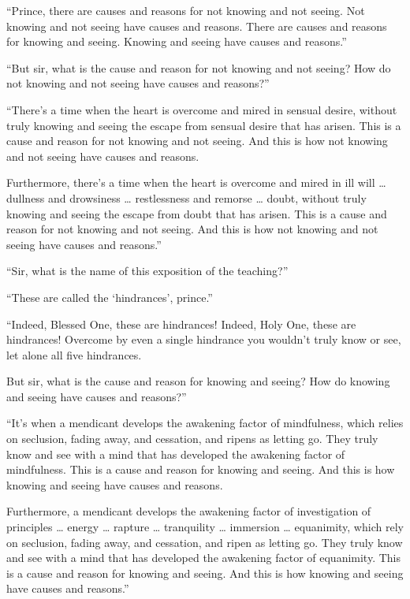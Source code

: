 \documentclass[12pt,openany]{book}%
\begin{document}
“Prince, there are causes and reasons for not knowing and not seeing. Not knowing and not seeing have causes and reasons. There are causes and reasons for knowing and seeing. Knowing and seeing have causes and reasons.” 

“But sir, what is the cause and reason for not knowing and not seeing? How do not knowing and not seeing have causes and reasons?” 

“There’s a time when the heart is overcome and mired in sensual desire, without truly knowing and seeing the escape from sensual desire that has arisen. This is a cause and reason for not knowing and not seeing. And this is how not knowing and not seeing have causes and reasons. 

Furthermore, there’s a time when the heart is overcome and mired in ill will … dullness and drowsiness … restlessness and remorse … doubt, without truly knowing and seeing the escape from doubt that has arisen. This is a cause and reason for not knowing and not seeing. And this is how not knowing and not seeing have causes and reasons.” 

“Sir, what is the name of this exposition of the teaching?” 

“These are called the ‘hindrances’, prince.” 

“Indeed, Blessed One, these are hindrances! Indeed, Holy One, these are hindrances! Overcome by even a single hindrance you wouldn’t truly know or see, let alone all five hindrances. 

But sir, what is the cause and reason for knowing and seeing? How do knowing and seeing have causes and reasons?” 

“It’s when a mendicant develops the awakening factor of mindfulness, which relies on seclusion, fading away, and cessation, and ripens as letting go. They truly know and see with a mind that has developed the awakening factor of mindfulness. This is a cause and reason for knowing and seeing. And this is how knowing and seeing have causes and reasons. 

Furthermore, a mendicant develops the awakening factor of investigation of principles … energy … rapture … tranquility … immersion … equanimity, which rely on seclusion, fading away, and cessation, and ripen as letting go. They truly know and see with a mind that has developed the awakening factor of equanimity. This is a cause and reason for knowing and seeing. And this is how knowing and seeing have causes and reasons.” 
\end{document}
